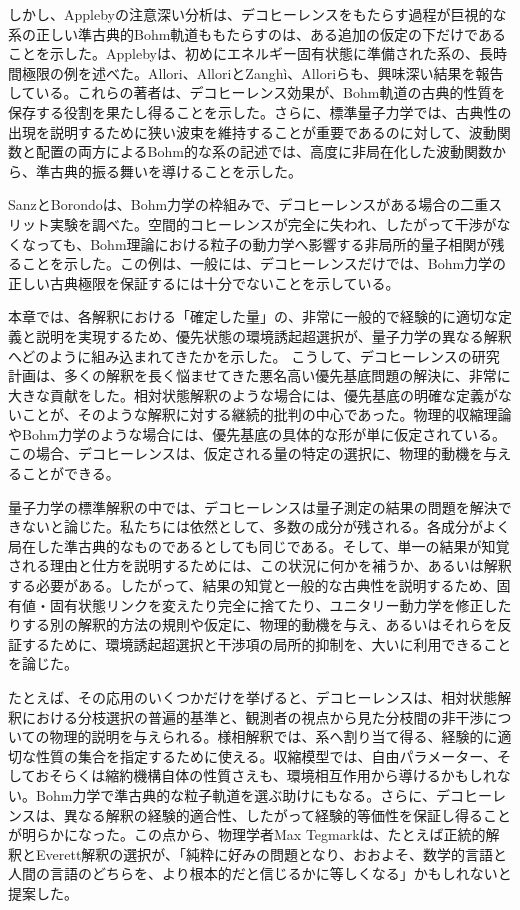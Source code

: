 しかし、Appleby\cite{ref490}の注意深い分析は、デコヒーレンスをもたらす過程が巨視的な系の正しい準古典的Bohm軌道ももたらすのは、ある追加の仮定の下だけであることを示した。Applebyは、初めにエネルギー固有状態に準備された系の、長時間極限の例を述べた。Allori\cite{ref491}、AlloriとZanghì\cite{ref492}、Alloriら\cite{ref493}も、興味深い結果を報告している。これらの著者は、デコヒーレンス効果が、Bohm軌道の古典的性質を保存する役割を果たし得ることを示した。さらに、標準量子力学では、古典性の出現を説明するために狭い波束を維持することが重要であるのに対して、波動関数と配置の両方によるBohm的な系の記述では、高度に非局在化した波動関数から、準古典的振る舞いを導けることを示した。

SanzとBorondo\cite{ref494}は、Bohm力学の枠組みで、デコヒーレンスがある場合の二重スリット実験を調べた。空間的コヒーレンスが完全に失われ、したがって干渉がなくなっても、Bohm理論における粒子の動力学へ影響する非局所的量子相関が残ることを示した。この例は、一般には、デコヒーレンスだけでは、Bohm力学の正しい古典極限を保証するには十分でないことを示している。

本章では、各解釈における「確定した量」の、非常に一般的で経験的に適切な定義と説明を実現するため、優先状態の環境誘起超選択が、量子力学の異なる解釈へどのように組み込まれてきたかを示した。
\hypertarget{srcpage:358}{}\label{srcpage:358}
こうして、デコヒーレンスの研究計画は、多くの解釈を長く悩ませてきた悪名高い優先基底問題の解決に、非常に大きな貢献をした。相対状態解釈のような場合には、優先基底の明確な定義がないことが、そのような解釈に対する継続的批判の中心であった。物理的収縮理論やBohm力学のような場合には、優先基底の具体的な形が単に仮定されている。この場合、デコヒーレンスは、仮定される量の特定の選択に、物理的動機を与えることができる。

量子力学の標準解釈の中では、デコヒーレンスは量子測定の結果の問題を解決できないと論じた。私たちには依然として、多数の成分が残される。各成分がよく局在した準古典的なものであるとしても同じである。そして、単一の結果が知覚される理由と仕方を説明するためには、この状況に何かを補うか、あるいは解釈する必要がある。したがって、結果の知覚と一般的な古典性を説明するため、固有値・固有状態リンクを変えたり完全に捨てたり、ユニタリー動力学を修正したりする別の解釈的方法の規則や仮定に、物理的動機を与え、あるいはそれらを反証するために、環境誘起超選択と干渉項の局所的抑制を、大いに利用できることを論じた。

たとえば、その応用のいくつかだけを挙げると、デコヒーレンスは、相対状態解釈における分枝選択の普遍的基準と、観測者の視点から見た分枝間の非干渉についての物理的説明を与えられる。様相解釈では、系へ割り当て得る、経験的に適切な性質の集合を指定するために使える。収縮模型では、自由パラメーター、そしておそらくは縮約機構自体の性質さえも、環境相互作用から導けるかもしれない。Bohm力学で準古典的な粒子軌道を選ぶ助けにもなる。さらに、デコヒーレンスは、異なる解釈の経験的適合性、したがって経験的等価性を保証し得ることが明らかになった。この点から、物理学者Max Tegmarkは、たとえば正統的解釈とEverett解釈の選択が、「純粋に好みの問題となり、おおよそ、数学的言語と人間の言語のどちらを、より根本的だと信じるかに等しくなる」\cite[855頁]{ref495}かもしれないと提案した。

